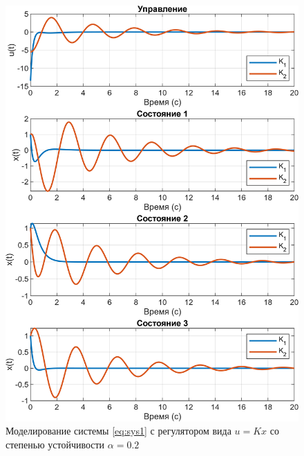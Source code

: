 \begin{figure}[H]
    \centering
    \includegraphics[width=\linewidth]{figs/task11.png}
    \caption{Моделирование системы \eqref{eq:sys1} с регулятором вида $u=Kx$
    со степенью устойчивости $\alpha=0.2$}
    \label{fig:2k1}
\end{figure}




